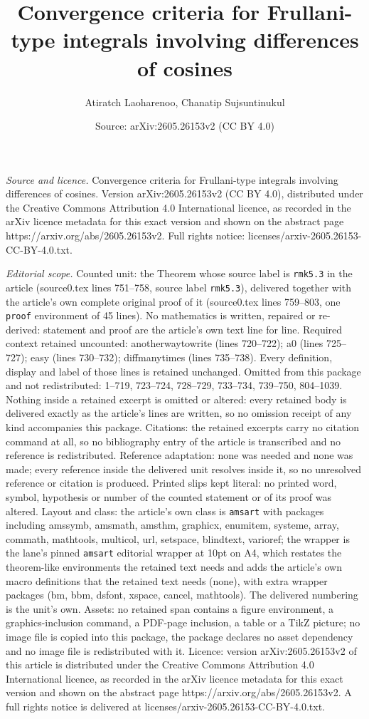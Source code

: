 \documentclass[10pt,a4paper]{amsart}
\title[Convergence criteria for Frullani-type integrals involving d]{Convergence criteria for Frullani-type integrals involving differences of cosines}
\author{Atiratch Laoharenoo, Chanatip Sujsuntinukul}
\date{Source: arXiv:2605.26153v2 (CC BY 4.0)}
\begin{document}
\maketitle

\noindent\emph{Source and licence.} Convergence criteria for Frullani-type integrals involving differences of cosines. Version arXiv:2605.26153v2 (CC BY 4.0), distributed under the Creative Commons Attribution 4.0 International licence, as recorded in the arXiv licence metadata for this exact version and shown on the abstract page https://arxiv.org/abs/2605.26153v2. Full rights notice: licenses/arxiv-2605.26153-CC-BY-4.0.txt.\par\smallskip

\noindent\textit{Editorial scope.} Counted unit: the Theorem whose source label is \texttt{rmk5.3} in the article (source0.tex lines 751--758, source label \texttt{rmk5.3}), delivered together with the article's own complete original proof of it (source0.tex lines 759--803, one \texttt{proof} environment of 45 lines). No mathematics is written, repaired or re-derived: statement and proof are the article's own text line for line. Required context retained uncounted: anotherwaytowrite (lines 720--722); a0 (lines 725--727); easy (lines 730--732); diffmanytimes (lines 735--738). Every definition, display and label of those lines is retained unchanged. Omitted from this package and not redistributed: 1--719, 723--724, 728--729, 733--734, 739--750, 804--1039. Nothing inside a retained excerpt is omitted or altered: every retained body is delivered exactly as the article's lines are written, so no omission receipt of any kind accompanies this package. Citations: the retained excerpts carry no citation command at all, so no bibliography entry of the article is transcribed and no reference is redistributed. Reference adaptation: none was needed and none was made; every reference inside the delivered unit resolves inside it, so no unresolved reference or citation is produced. Printed slips kept literal: no printed word, symbol, hypothesis or number of the counted statement or of its proof was altered. Layout and class: the article's own class is \texttt{amsart} with packages including amssymb, amsmath, amsthm, graphicx, enumitem, systeme, array, commath, mathtools, multicol, url, setspace, blindtext, varioref; the wrapper is the lane's pinned \texttt{amsart} editorial wrapper at 10pt on A4, which restates the theorem-like environments the retained text needs and adds the article's own macro definitions that the retained text needs (none), with extra wrapper packages (bm, bbm, dsfont, xspace, cancel, mathtools). The delivered numbering is the unit's own. Assets: no retained span contains a figure environment, a graphics-inclusion command, a PDF-page inclusion, a table or a TikZ picture; no image file is copied into this package, the package declares no asset dependency and no image file is redistributed with it. Licence: version arXiv:2605.26153v2 of this article is distributed under the Creative Commons Attribution 4.0 International licence, as recorded in the arXiv licence metadata for this exact version and shown on the abstract page https://arxiv.org/abs/2605.26153v2. A full rights notice is delivered at licenses/arxiv-2605.26153-CC-BY-4.0.txt. 
\end{document}
